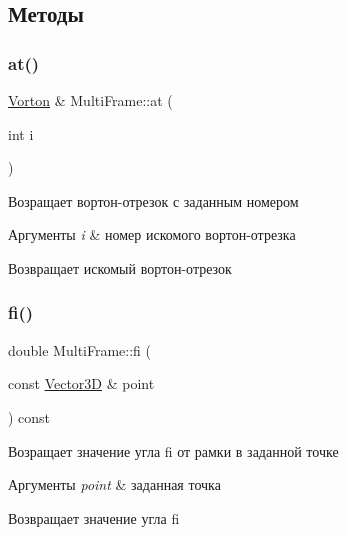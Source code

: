 \subsection{Методы}
\mbox{\label{class_multi_frame_a5295ef9753e14e5ea136a18563a918b8}} 
\subsubsection{\texorpdfstring{at()}{at()}}
{\footnotesize\ttfamily \mbox{\hyperlink{class_vorton}{Vorton}} \& Multi\+Frame\+::at (\begin{DoxyParamCaption}\item[{int}]{i }\end{DoxyParamCaption})\hspace{0.3cm}{\ttfamily [virtual]}}

Возращает вортон-\/отрезок с заданным номером 
\begin{DoxyParams}{Аргументы}
{\em i} & номер искомого вортон-\/отрезка \\
\hline
\end{DoxyParams}
\begin{DoxyReturn}{Возвращает}
искомый вортон-\/отрезок 
\end{DoxyReturn}
\mbox{\label{class_multi_frame_ac9aa5421ef5127a6465a2ead23b97c78}} 
\subsubsection{\texorpdfstring{fi()}{fi()}}
{\footnotesize\ttfamily double Multi\+Frame\+::fi (\begin{DoxyParamCaption}\item[{const \mbox{\hyperlink{class_vector3_d}{Vector3D}} \&}]{point }\end{DoxyParamCaption}) const\hspace{0.3cm}{\ttfamily [virtual]}}

Возращает значение угла fi от рамки в заданной точке 
\begin{DoxyParams}{Аргументы}
{\em point} & заданная точка \\
\hline
\end{DoxyParams}
\begin{DoxyReturn}{Возвращает}
значение угла fi 
\end{DoxyReturn}
\mbox{\label{class_multi_frame_a6ac6294e45d6337e72d91cec60080ff4}} 
